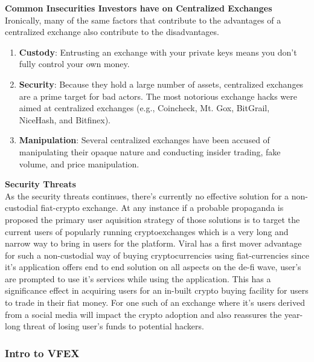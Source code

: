 \documentclass[10pt]{article}
\begin{document}
\textbf{Common Insecurities Investors have on Centralized Exchanges}\\

Ironically, many of the same factors that contribute to the advantages of a centralized exchange also contribute to the disadvantages.
\begin{enumerate}[leftmargin=+0.2in]
\item \textbf{Custody}: Entrusting an exchange with your private keys means you don’t fully control your own money.

\item \textbf{Security}: Because they hold a large number of assets, centralized exchanges are a prime target for bad actors. The most notorious exchange hacks were aimed at centralized exchanges (e.g., Coincheck, Mt. Gox, BitGrail, NiceHash, and Bitfinex).

\item \textbf{Manipulation}: Several centralized exchanges have been accused of manipulating their opaque nature and conducting insider trading, fake volume, and price manipulation.
\end{enumerate}

\textbf{Security Threats}\\

As the security threats continues, there's currently no effective solution for a non-custodial fiat-crypto exchange. At any instance if a probable propaganda is proposed the primary user aquisition strategy of those solutions is to target the current users of popularly running cryptoexchanges which is a very long and narrow way to bring in users for the platform. Viral has a first mover advantage for such a non-custodial way of buying cryptocurrencies using fiat-currencies since it's application offers end to end solution on all aspects on the de-fi wave, user's are prompted to use it's services while using the application. This has a significance effect in acquiring users for an in-built crypto buying facility for users to trade in their fiat money. For one such of an exchange where it's users derived from a social media will impact the crypto adoption and also reassures the year-long threat of losing user's funds to potential hackers.\\

\subsubsection{Intro to VFEX}
\end{document}
